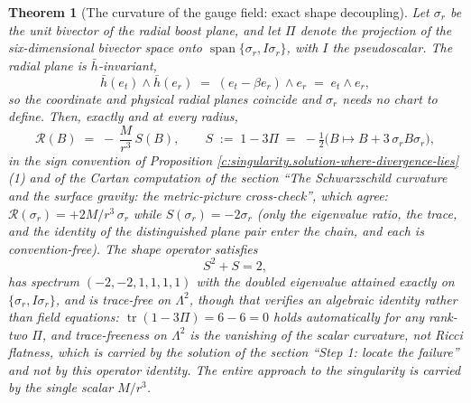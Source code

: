 \documentclass[11pt]{article}
\newtheorem{theorem}{Theorem}[section]
\theoremstyle{definition}
\theoremstyle{plain}
\newcommand{\changedmark}[2]{\marginpar{\raggedright\scriptsize\color{#1}#2}}
\providecommand{\er}{}\renewcommand{\er}{e_r}
\providecommand{\et}{}\renewcommand{\et}{e_t}
\providecommand{\hb}{}\renewcommand{\hb}{\bar{h}}
\providecommand{\tr}{}\renewcommand{\tr}{\operatorname{tr}}
\begin{document}
\begin{theorem}[The curvature of the gauge field: exact shape decoupling]\label{c:singularity.curvature-gauge-field-exact-shape-decoupling}
\changedmark{gray}{reworded}
Let $\sigma_r$ be the unit bivector of the radial boost plane, and let $\Pi$ denote the projection of the six-dimensional bivector space onto $\operatorname{span}\{\sigma_r, I\sigma_r\}$, with $I$ the pseudoscalar. The radial plane is $\hb$-invariant,
\[
\hb(\et) \wedge \hb(\er) \;=\; (\et - \beta\er) \wedge \er \;=\; \et \wedge \er ,
\]
so the coordinate and physical radial planes coincide and $\sigma_r$ needs no chart to define. Then, exactly and at every radius,
\[
\mathcal{R}(B) \;=\; -\,\frac{M}{r^3}\,S(B), \qquad
S \;:=\; 1 - 3\Pi \;=\; -\tfrac12\bigl(B \mapsto B + 3\,\sigma_r B \sigma_r\bigr),
\]
in the sign convention of Proposition \ref{c:singularity.solution-where-divergence-lies}(1) and of the Cartan computation of the section ``The Schwarzschild curvature and the surface gravity: the metric-picture cross-check'', which agree: $\mathcal{R}(\sigma_r) = +2M/r^{3}\,\sigma_r$ while $S(\sigma_r) = -2\sigma_r$ (only the eigenvalue ratio, the trace, and the identity of the distinguished plane pair enter the chain, and each is convention-free). The shape operator satisfies
\[
S^2 + S = 2 ,
\]
has spectrum $(-2, -2, 1, 1, 1, 1)$ with the doubled eigenvalue attained exactly on $\{\sigma_r, I\sigma_r\}$, and is trace-free on $\Lambda^2$, though that verifies an algebraic identity rather than field equations: $\tr(1 - 3\Pi) = 6 - 6 = 0$ holds automatically for any rank-two $\Pi$, and trace-freeness on $\Lambda^2$ is the vanishing of the scalar curvature, not Ricci flatness, which is carried by the solution of the section ``Step 1: locate the failure'' and not by this operator identity. The entire approach to the singularity is carried by the single scalar $M/r^3$.
\end{theorem}
\end{document}

